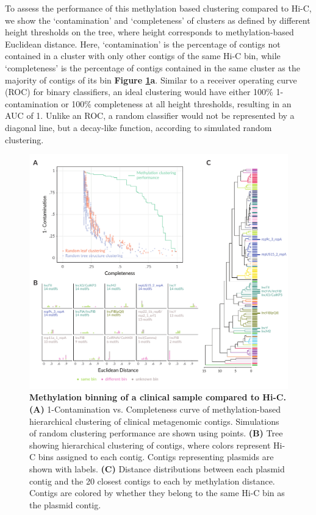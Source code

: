 To assess the performance of this methylation based clustering compared to Hi-C, we show the ‘contamination’ and ‘completeness’ of clusters as defined by different height thresholds on the tree, where height corresponds to methylation-based Euclidean distance. Here, ‘contamination’ is the percentage of contigs not contained in a cluster with only other contigs of the same Hi-C bin, while ‘completeness’ is the percentage of contigs contained in the same cluster as the majority of contigs of its bin {\bf Figure \ref{fig:mdrfig}a}. Similar to a receiver operating curve (ROC) for binary classifiers, an ideal clustering would have either 100\% 1-contamination or 100\% completeness at all height thresholds, resulting in an AUC of 1. Unlike an ROC, a random classifier would not be represented by a diagonal line, but a decay-like function, according to simulated random clustering.


\begin{figure}[!hb]
\centering
\includegraphics[width = 1\linewidth,keepaspectratio]{figure/mdrfig.pdf}
\caption[Methylation binning of a clinical sample compared to Hi-C]{{\bf Methylation binning of a clinical sample compared to Hi-C.} {\bf (A)} 1-Contamination vs. Completeness curve of methylation-based hierarchical clustering of clinical metagenomic contigs. Simulations of random clustering performance are shown using points. {\bf (B)} Tree showing hierarchical clustering of contigs, where colors represent Hi-C bins assigned to each contig. Contigs representing plasmids are shown with labels. {\bf (C)} Distance distributions between each plasmid contig and the 20 closest contigs to each by methylation distance. Contigs are colored by whether they belong to the same Hi-C bin as the plasmid contig. }
\label{fig:mdrfig}
\end{figure}




